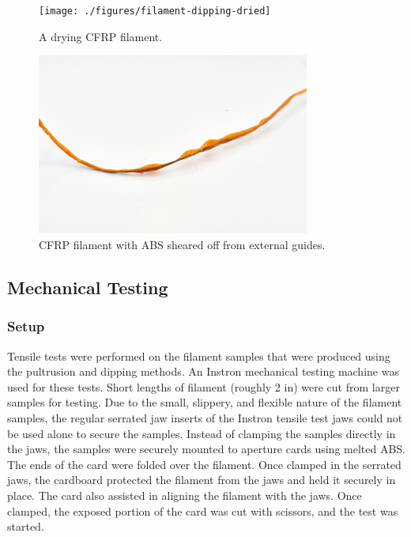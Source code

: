 
\begin{figure}[htp]
    \centering
    \texttt{[image: ./figures/filament-dipping-dried]}
    \caption{A drying CFRP filament.}
    \label{fig:filament-dipping-dried}
\end{figure}



\begin{figure}[htp]
    \centering
    \includegraphics[width=0.8\textwidth]{./figures/filament-dipping-shear}
    \caption{CFRP filament with ABS sheared off from external guides.}
    \label{fig:filament-dipping-shear}
\end{figure}

\clearpage

\subsection{Mechanical Testing}

\indent

\subsubsection{Setup}

\indent

Tensile tests were performed on the filament samples that were produced using the pultrusion and dipping methods. An Instron mechanical testing machine was used for these tests. Short lengths of filament (roughly 2 in) were cut from larger samples for testing. Due to the small, slippery,  and flexible nature of the filament samples, the regular serrated jaw inserts of the Instron tensile test jaws could not be used alone to secure the samples. Instead of clamping the samples directly in the jaws, the samples were securely mounted to aperture cards using melted ABS. The ends of the card were folded over the filament. Once clamped in the serrated jaws, the cardboard protected the filament from the jaws and held it securely in place. The card also assisted in aligning the filament with the jaws. Once clamped, the exposed portion of the card was cut with scissors, and the test was started.\\

